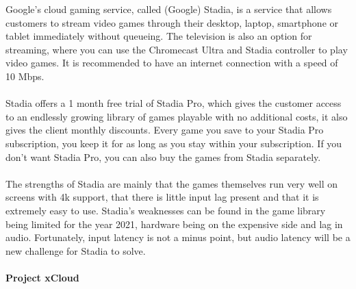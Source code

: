 Google's cloud gaming service, called (Google) Stadia, is a service that allows customers to stream video games through their desktop, laptop, smartphone or tablet immediately without queueing. The television is also an option for streaming, where you can use the Chromecast Ultra and Stadia controller to play video games. It is recommended to have an internet connection with a speed of 10 Mbps.\\\\
Stadia offers a 1 month free trial of Stadia Pro, which gives the customer access to an endlessly growing library of games playable with no additional costs, it also gives the client monthly discounts. Every game you save to your Stadia Pro subscription, you keep it for as long as you stay within your subscription. If you don't want Stadia Pro, you can also buy the games from Stadia separately.\\\\
The strengths of Stadia are mainly that the games themselves run very well on screens with 4k support, that there is little input lag present and that it is extremely easy to use. Stadia's weaknesses can be found in the game library being limited for the year 2021, hardware being on the expensive side and lag in audio. Fortunately, input latency is not a minus point, but audio latency will be a new challenge for Stadia to solve.\\\\
\textbf{Project xCloud}\\\\